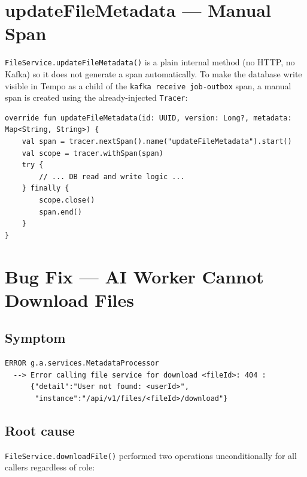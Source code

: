 \documentclass[11pt,a4paper]{article}
\begin{document}
\section{updateFileMetadata --- Manual Span}

\texttt{FileService.updateFileMetadata()} is a plain internal method (no HTTP,
no Kafka) so it does not generate a span automatically.  To make the database
write visible in Tempo as a child of the \texttt{kafka receive job-outbox} span,
a manual span is created using the already-injected \texttt{Tracer}:

\begin{lstlisting}[style=kotlin, caption={FileService.kt --- updateFileMetadata()}]
override fun updateFileMetadata(id: UUID, version: Long?, metadata: Map<String, String>) {
    val span = tracer.nextSpan().name("updateFileMetadata").start()
    val scope = tracer.withSpan(span)
    try {
        // ... DB read and write logic ...
    } finally {
        scope.close()
        span.end()
    }
}
\end{lstlisting}

\section{Bug Fix --- AI Worker Cannot Download Files}

\subsection{Symptom}

\begin{lstlisting}[style=code, caption={Error log from AIProcessingService}]
ERROR g.a.services.MetadataProcessor
  --> Error calling file service for download <fileId>: 404 :
      {"detail":"User not found: <userId>",
       "instance":"/api/v1/files/<fileId>/download"}
\end{lstlisting}

\subsection{Root cause}

\texttt{FileService.downloadFile()} performed two operations unconditionally for
all callers regardless of role:
\end{document}

